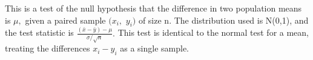  This is a test of the null hypothesis that the difference in two 
population means is $ \mu , $ given a paired sample $(x_{i},$  $y_{i})$  of size n. The distribution used is N(0,1),
and the test statistic is $ \frac{ ( \bar{x} - \bar{y} ) - \mu }
{\sigma / \sqrt{n} } . $ This test is identical to the normal
test for a mean, treating the differences $x_{i}-y_{i}$ 
as a single sample.

